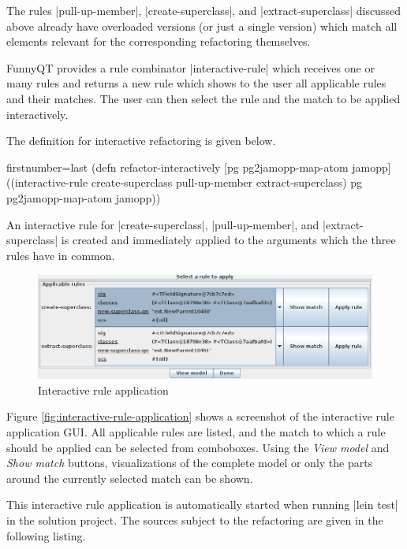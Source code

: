 \documentclass[submission]{eptcs}
\newcommand{\code}{\clojureinline}
\begin{document}
\begin{sloppypar}
  The rules \code|pull-up-member|, \code|create-superclass|, and
  \code|extract-superclass| discussed above already have overloaded versions
  (or just a single version) which match all elements relevant for the
  corresponding refactoring themselves.
\end{sloppypar}

FunnyQT provides a rule combinator \code|interactive-rule| which receives one
or many rules and returns a new rule which shows to the user all applicable
rules and their matches.  The user can then select the rule and the match to be
applied interactively.

The definition for interactive refactoring is given below.

\begin{clojurecode*}{firstnumber=last}
(defn refactor-interactively [pg pg2jamopp-map-atom jamopp]
  ((interactive-rule create-superclass pull-up-member extract-superclass)
   pg pg2jamopp-map-atom jamopp))
\end{clojurecode*}

An interactive rule for \code|create-superclass|, \code|pull-up-member|, and
\code|extract-superclass| is created and immediately applied to the arguments
which the three rules have in common.

\begin{figure}[h!tb]
  \centering
  \includegraphics[width=\textwidth]{propose-refactoring}
  \caption{Interactive rule application}
  \label{fig:interactive-rule-application}
\end{figure}

Figure \vref{fig:interactive-rule-application} shows a screenshot of the
interactive rule application GUI.  All applicable rules are listed, and the
match to which a rule should be applied can be selected from comboboxes.  Using
the \emph{View model} and \emph{Show match} buttons, visualizations of the
complete model or only the parts around the currently selected match can be
shown.

This interactive rule application is automatically started when running
\code|lein test| in the solution project.  The sources subject to the
refactoring are given in the following listing.
\end{document}
